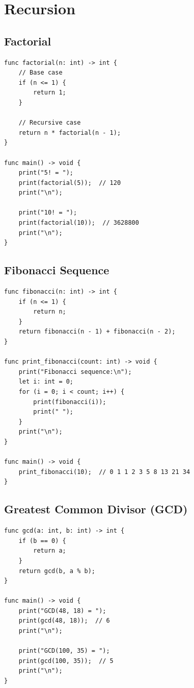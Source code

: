 \documentclass[12pt,a4paper,oneside]{book}
\begin{document}
\section{Recursion}

\subsection{Factorial}

\begin{lstlisting}[style=algo, caption={Recursive Factorial}]
func factorial(n: int) -> int {
    // Base case
    if (n <= 1) {
        return 1;
    }
    
    // Recursive case
    return n * factorial(n - 1);
}

func main() -> void {
    print("5! = ");
    print(factorial(5));  // 120
    print("\n");
    
    print("10! = ");
    print(factorial(10));  // 3628800
    print("\n");
}
\end{lstlisting}

\subsection{Fibonacci Sequence}

\begin{lstlisting}[style=algo, caption={Recursive Fibonacci}]
func fibonacci(n: int) -> int {
    if (n <= 1) {
        return n;
    }
    return fibonacci(n - 1) + fibonacci(n - 2);
}

func print_fibonacci(count: int) -> void {
    print("Fibonacci sequence:\n");
    let i: int = 0;
    for (i = 0; i < count; i++) {
        print(fibonacci(i));
        print(" ");
    }
    print("\n");
}

func main() -> void {
    print_fibonacci(10);  // 0 1 1 2 3 5 8 13 21 34
}
\end{lstlisting}

\subsection{Greatest Common Divisor (GCD)}

\begin{lstlisting}[style=algo, caption={Euclidean Algorithm}]
func gcd(a: int, b: int) -> int {
    if (b == 0) {
        return a;
    }
    return gcd(b, a % b);
}

func main() -> void {
    print("GCD(48, 18) = ");
    print(gcd(48, 18));  // 6
    print("\n");
    
    print("GCD(100, 35) = ");
    print(gcd(100, 35));  // 5
    print("\n");
}
\end{lstlisting}
\end{document}
